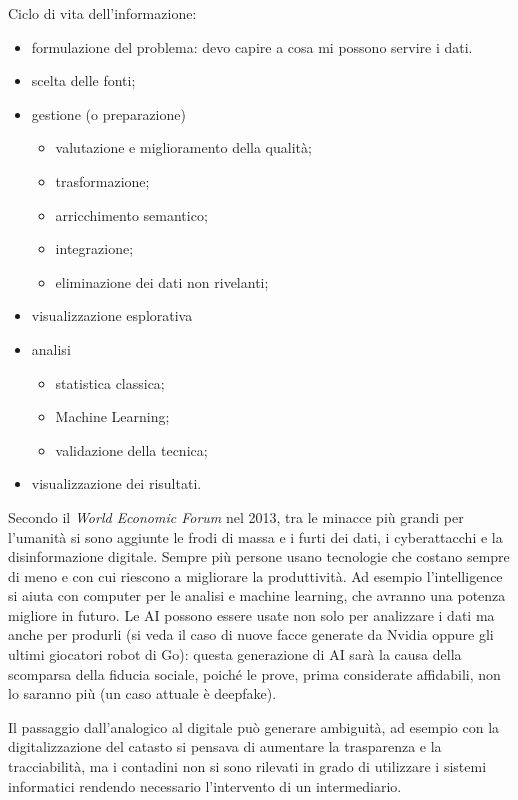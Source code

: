 \documentclass[a4page, 11pt]{article}
\begin{document}
Ciclo di vita dell'informazione:
\begin{itemize}
  \item formulazione del problema: devo capire a cosa mi possono servire i dati.
  \item scelta delle fonti;
  \item gestione (o preparazione)
    \begin{itemize}
      \item valutazione e miglioramento della qualità;
      \item trasformazione;
      \item arricchimento semantico;
      \item integrazione;
      \item eliminazione dei dati non rivelanti;
    \end{itemize}
  \item visualizzazione esplorativa
  \item analisi
    \begin{itemize}
      \item statistica classica;
      \item Machine Learning;
      \item validazione della tecnica;
    \end{itemize}
  \item visualizzazione dei risultati.
\end{itemize}

Secondo il \textit{World Economic Forum} nel 2013, tra le minacce più grandi per l'umanità si sono aggiunte le frodi di massa e i furti dei dati, i cyberattacchi e la disinformazione digitale.
Sempre più persone usano tecnologie che costano sempre di meno e con cui riescono a migliorare la produttività.
Ad esempio l'intelligence si aiuta con computer per le analisi e machine learning, che avranno una potenza migliore in futuro.
Le AI possono essere usate non solo per analizzare i dati ma anche per produrli (si veda il caso di nuove facce generate da Nvidia oppure gli ultimi giocatori robot di Go): questa generazione di AI sarà la causa della scomparsa della fiducia sociale, poiché le prove, prima considerate affidabili, non lo saranno più (un caso attuale è deepfake).

Il passaggio dall'analogico al digitale può generare ambiguità, ad esempio con la digitalizzazione del catasto si pensava di aumentare la trasparenza e la tracciabilità, ma i contadini non si sono rilevati in grado di utilizzare i sistemi informatici rendendo necessario l'intervento di un intermediario.
\end{document}
